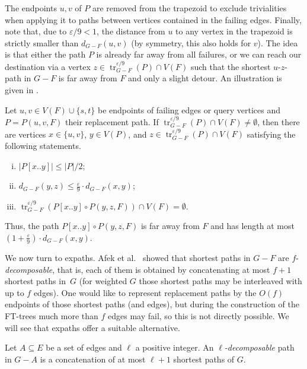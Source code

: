\documentclass{article}\usepackage[a4paper,margin=20mm]{geometry}
\DeclareMathOperator{\tr}{tr}
\newcommand*{\length}[1]{|#1|}
\renewcommand{\le}{\leqslant}
\newcommand{\eps}{\varepsilon}
\begin{document}
The endpoints $u,v$ of $P$ are removed from the trapezoid
to exclude trivialities when applying it to paths
between vertices contained in the failing edges.
Finally, note that, due to $\eps/9 < 1$, 
the distance from $u$ to any vertex in the trapezoid is strictly smaller than $d_{G-F}(u,v)$
(by symmetry, this also holds for $v$).
The idea is that either the path $P$
is already far away from all failures, 
or we can reach our destination via a vertex $z \in \tr^{\eps/9}_{G-F}(P) \cap V(F)$
such that the shortest $u$-$z$-path in $G-F$ is far away from $F$
and only a slight detour.
An illustration is given in .

\begin{lemma}
\label{lem:not_too_far_off}
  Let $u,v \in V(F) \cup \{s,t\}$ be endpoints of failing edges or query vertices
  and $P = P(u,v,F)$ their replacement path.
  If $\tr^{\eps/9}_{G-F}(P) \cap V(F) \neq \emptyset$,
  then there are vertices $x \in \{u,v\}$, $y \in V(P)$,
  and $z \in \tr^{\eps/9}_{G-F}(P) \cap V(F)$ satisfying the following statements.
  \begin{enumerate}[(i)]
    \item $\length{P[x..y]} \le \length{P}/2$;
    \item $d_{G-F}(y,z) \le \frac{\eps}{9} \cdot d_{G-F}(x,y)$;
    \item $\tr^{\eps/9}_{G-F}(P[x..y] \circ P(y,z,F)) \cap V(F) = \emptyset$.
  \end{enumerate}
  Thus, the path $P[x..y] \circ P(y,z,F)$ is far away from $F$
  and has length at most $(1+ \tfrac{\eps}{9}) \cdot d_{G-F}(x,y)$.
\end{lemma}

We now turn to expaths.
Afek et al.~\cite{Afek02RestorationbyPathConcatenation_journal} 
showed that shortest paths in $G-F$ are $f$-\emph{decomposable},
that is, each of them is obtained by concatenating at most $f+1$ shortest paths in~$G$ 
(for weighted $G$ those shortest paths may be interleaved with up to $f$ edges).
One would like to represent replacement paths by the $O(f)$ endpoints of those shortest paths (and edges),
but during the construction of the FT-trees much more than $f$ edges may fail,
so this is not directly possible.
We will see that expaths offer a suitable alternative.

\begin{definition}
\label{definition:h-decomposable}
Let $A \subseteq E$ be a set of edges and $\ell$ a positive integer. 
An $\ell$\emph{-decomposable} path in $G - A$ is
a concatenation of at most $\ell+1$ shortest paths of $G$.
\end{definition}
\end{document}
